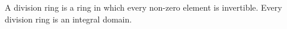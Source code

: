 A division ring is a ring in which every non-zero element is invertible. Every division ring is an integral domain.
